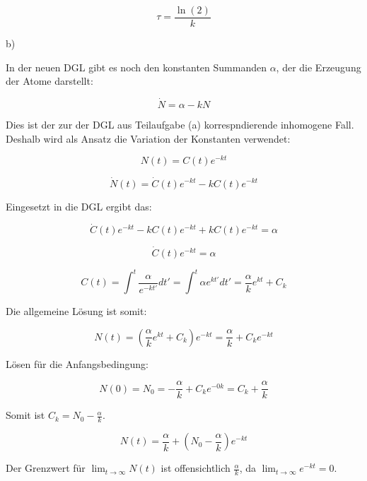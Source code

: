 \documentclass{theozettel}
\begin{document}
$$
\tau = \frac{\ln(2)}{k}
$$

b)

In der neuen DGL gibt es noch den konstanten Summanden $\alpha$, der die Erzeugung der Atome darstellt:

$$
\dot{N} = \alpha - k N
$$




Dies ist der zur der DGL aus Teilaufgabe (a) korrespndierende inhomogene Fall. Deshalb wird als Ansatz die Variation der Konstanten verwendet:

$$
N(t) = C(t) e^{-kt}
$$

$$
\dot{N}(t) = \dot{C}(t) e^{-kt} - k C(t) e^{-kt}
$$

Eingesetzt in die DGL ergibt das:

$$
\dot{C}(t) e^{-kt} - k C(t) e^{-kt} + k C(t) e^{-kt} = \alpha
$$

$$
\dot{C}(t) e^{-kt} = \alpha
$$

$$
C(t) = \int^{t} \frac{\alpha}{e^{-kt'}} dt' =  \int^{t} \alpha e^{kt'} dt' = \frac{\alpha}{k} e^{kt} + C_k
$$

Die allgemeine Lösung ist somit:

$$
N(t) = (\frac{\alpha}{k} e^{kt} + C_k) e^{-kt} = \frac{\alpha}{k} + C_k e^{-kt}
$$

Lösen für die Anfangsbedingung:

$$
N(0) = N_0 = - \frac{\alpha}{k} + C_k e^{-0k} = C_k + \frac{\alpha}{k} 
$$

Somit ist $C_k = N_0 - \frac{\alpha}{k} $.

$$
N(t) = \frac{\alpha}{k} + (N_0 - \frac{\alpha}{k}) e^{-kt}
$$

Der Grenzwert für $\lim_{t \to \infty} N(t)$ ist offensichtlich $\frac{\alpha}{k}$, da $\lim_{t \to \infty} e^{-kt} = 0$.


\newpage
\end{document}
